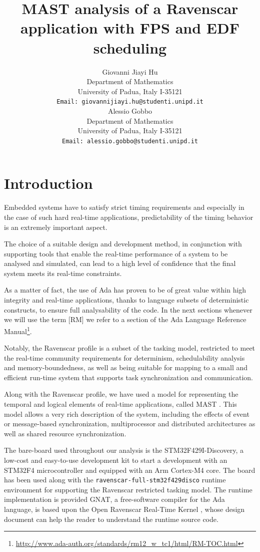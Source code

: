 \documentclass{article}
\title{MAST analysis of a Ravenscar application with FPS and EDF scheduling}
\author{
  Giovanni Jiayi Hu\\
  Department of Mathematics\\
  University of Padua, Italy I-35121\\
  \texttt{Email: giovannijiayi.hu@studenti.unipd.it} \\
   \And
   Alessio Gobbo \\
   Department of Mathematics\\
   University of Padua, Italy I-35121\\
   \texttt{Email: alessio.gobbo@studenti.unipd.it} \\
}
\begin{document}
\maketitle

\begin{abstract}
\lipsum[1]
\end{abstract}



\section{Introduction}

Embedded systems have to satisfy strict timing requirements and especially in the case of such hard real-time applications, predictability of the timing behavior is an extremely important aspect.

The choice of a suitable design and development method, in conjunction with supporting tools that enable the real-time performance of a system to be analysed and simulated, can lead to a high level of confidence that the final system meets its real-time constraints.

As a matter of fact, the use of Ada has proven to be of great value within high integrity and real-time applications, thanks to language subsets of deterministic constructs, to ensure full analysability of the code. In the next sections whenever we will use the term [RM] we refer to a section of the Ada Language Reference Manual\footnote{\url{http://www.ada-auth.org/standards/rm12_w_tc1/html/RM-TOC.html}}.

Notably, the Ravenscar profile \cite{ycs} is a subset of the tasking model, restricted to meet the real-time community requirements for determinism, schedulability analysis and memory-boundedness, as well as being suitable for mapping to a small and efficient run-time system that supports task synchronization and communication.

Along with the Ravenscar profile, we have used a model for representing the temporal and logical elements of real-time applications, called MAST \cite{mast}. This model allows a very rich description of the system, including the effects of event or message-based synchronization, multiprocessor and distributed architectures as well as shared resource synchronization.

The bare-board used throughout our analysis is the STM32F429I-Discovery, a low-cost and easy-to-use development kit to start a development with an STM32F4 microcontroller and equipped with an Arm Cortex-M4 core.
The board has been used along with the \texttt{ravenscar-full-stm32f429disco} runtime environment for supporting the Ravenscar restricted tasking model. The runtime implementation is provided GNAT, a free-software compiler for the Ada language, is based upon the Open Ravenscar Real-Time Kernel \cite{ork}, whose design document can help the reader to understand the runtime source code.
\end{document}
